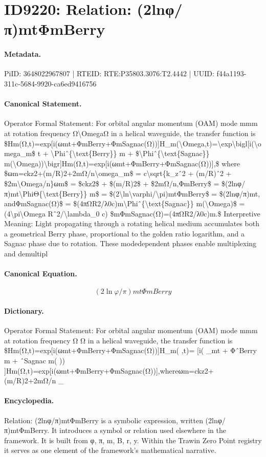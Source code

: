 \section*{ID9220: Relation: (2lnφ/π)mtΦmBerry}
\paragraph{Metadata.}
PiID: 3648022967807 | RTEID: RTE:P35803.3076:T2.4442 | UUID: f44a1193-311c-5684-9920-ca6ed9416756

\paragraph{Canonical Statement.}
Operator Formal Statement: For orbital angular momentum (OAM) mode mmm at rotation frequency Ω\textbackslash{}OmegaΩ in a helical waveguide, the transfer function is \$Hm(Ω,t)=exp[i(ωmt+ΦmBerry+ΦmSagnac(Ω))]H\_m(\textbackslash{}Omega,t)=\textbackslash{}exp\textbackslash{}bigl[i(\textbackslash{}omega\_m\$ t + \textbackslash{}Phiˆ\{\textbackslash{}text\{Berry\}\} m + \$\textbackslash{}Phiˆ\{\textbackslash{}text\{Sagnac\}\} m(\textbackslash{}Omega))\textbackslash{}bigr]Hm(Ω,t)=exp[i(ωmt+ΦmBerry+ΦmSagnac(Ω))],\$ where \$ωm=ckz2+(m/R)2+2mΩ/n\textbackslash{}omega\_m\$ = c\textbackslash{}sqrt\{k\_zˆ2 + (m/R)ˆ2 + \$2m\textbackslash{}Omega/n\}ωm\$ = \$ckz2\$ + \$(m/R)2\$ + \$2mΩ/n,ΦmBerry\$ = \$(2lnφ/π)mt\textbackslash{}PhiΘ\{\textbackslash{}text\{Berry\}\} m\$ = \$(2\textbackslash{}ln\textbackslash{}varphi/\textbackslash{}pi)mtΦmBerry\$ = \$(2lnφ/π)mt, andΦmSagnac(Ω)\$ = \$(4πΩR2/λ0c)m\textbackslash{}Phiˆ\{\textbackslash{}text\{Sagnac\}\} m(\textbackslash{}Omega)\$ = (4\textbackslash{}pi\textbackslash{}Omega Rˆ2/\textbackslash{}lambda\_0 c) \$mΦmSagnac(Ω)=(4πΩR2/λ0c)m.\$ Interpretive Meaning: Light propagating through a rotating helical medium accumulates both a geometrical Berry phase, proportional to the golden ratio logarithm, and a Sagnac phase due to rotation. These modedependent phases enable multiplexing and demultipl

\paragraph{Canonical Equation.}
\[
(2\ln\varphi/\pi)mtΦmBerry
\]

\paragraph{Dictionary.}
Operator Formal Statement: For orbital angular momentum (OAM) mode mmm at rotation frequency Ω Ω in a helical waveguide, the transfer function is \$Hm(Ω,t)=exp[i(ωmt+ΦmBerry+ΦmSagnac(Ω))]H\_m( ,t)= [i( \_mt + ΦˆBerry m + ˆSagnac m( )) ]Hm(Ω,t)=exp[i(ωmt+ΦmBerry+ΦmSagnac(Ω))],whereωm=ckz2+(m/R)2+2mΩ/n \_

\paragraph{Encyclopedia.}
Relation: (2lnφ/π)mtΦmBerry is a symbolic expression, written (2lnφ/π)mtΦmBerry. It introduces a symbol or relation used elsewhere in the framework. It is built from φ, π, m, B, r, y. Within the Trawin Zero Point registry it serves as one element of the framework's mathematical narrative.
